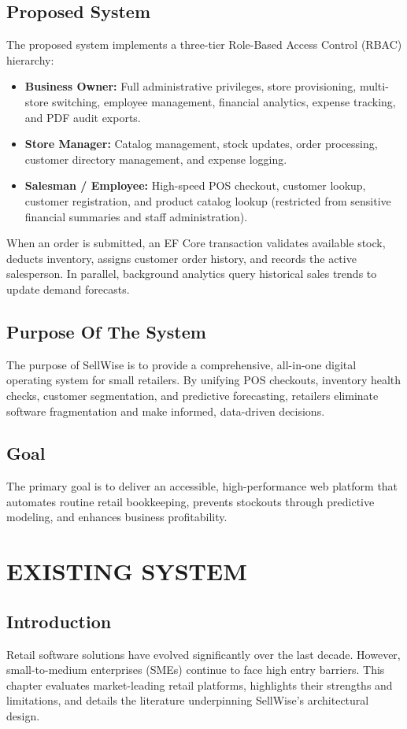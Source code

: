 \documentclass[12pt,a4paper]{report}
\begin{document}
\section{Proposed System}
The proposed system implements a three-tier Role-Based Access Control (RBAC) hierarchy:
\begin{itemize}
    \item \textbf{Business Owner:} Full administrative privileges, store provisioning, multi-store switching, employee management, financial analytics, expense tracking, and PDF audit exports.
    \item \textbf{Store Manager:} Catalog management, stock updates, order processing, customer directory management, and expense logging.
    \item \textbf{Salesman / Employee:} High-speed POS checkout, customer lookup, customer registration, and product catalog lookup (restricted from sensitive financial summaries and staff administration).
\end{itemize}

When an order is submitted, an EF Core transaction validates available stock, deducts inventory, assigns customer order history, and records the active salesperson. In parallel, background analytics query historical sales trends to update demand forecasts.

\section{Purpose Of The System}
The purpose of SellWise is to provide a comprehensive, all-in-one digital operating system for small retailers. By unifying POS checkouts, inventory health checks, customer segmentation, and predictive forecasting, retailers eliminate software fragmentation and make informed, data-driven decisions.

\section{Goal}
The primary goal is to deliver an accessible, high-performance web platform that automates routine retail bookkeeping, prevents stockouts through predictive modeling, and enhances business profitability.

\chapter{EXISTING SYSTEM}

\section{Introduction}
Retail software solutions have evolved significantly over the last decade. However, small-to-medium enterprises (SMEs) continue to face high entry barriers. This chapter evaluates market-leading retail platforms, highlights their strengths and limitations, and details the literature underpinning SellWise's architectural design.
\end{document}
